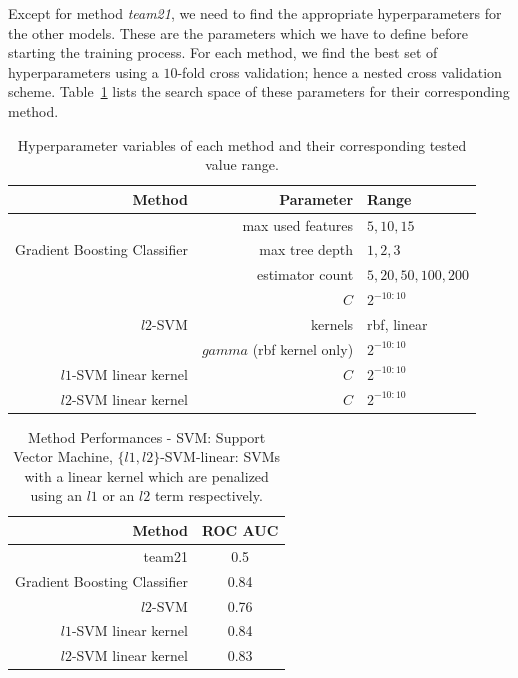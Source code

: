 Except for method \emph{team21}, we need to find the appropriate hyperparameters for the other models. These are the parameters which we have to define before starting the training process. For each method, we find the best set of hyperparameters using a $10$-fold cross validation; hence a nested cross 
validation scheme. Table~\ref{tbl:fcs-qa:hyperparameters} lists the search space of these parameters for their corresponding method.

\begin{table}[!ht]
  \centering
  \begin{tabular}{rrl}
    Method & Parameter & Range \\ \hline \rule{0pt}{2.4ex}
    & max used features & ${5, 10, 15}$  \\
    Gradient Boosting Classifier & max tree depth & ${1, 2, 3}$ \\
    & estimator count & ${5, 20, 50, 100, 200}$ \\ \hline \rule{0pt}{2.4ex}
    & $C$ & $2^{-10:10}$ \\
    $l2$-SVM & kernels & rbf, linear \\
	& $gamma$ (rbf kernel only) & $2^{-10:10}$ \\ \hline \rule{0pt}{2.4ex}
    $l1$-SVM linear kernel & $C$ & $2^{-10:10}$ \\ \hline \rule{0pt}{2.4ex}
    $l2$-SVM linear kernel & $C$ & $2^{-10:10}$ \\
  \end{tabular}
  \caption{Hyperparameter variables of each method and their corresponding tested value range.}
  \label{tbl:fcs-qa:hyperparameters}
\end{table}


\begin{table}[!ht]
  \centering
  \begin{tabular}{rc}
    Method & ROC AUC \\ \hline
    team21 & 0.5  \\
    Gradient Boosting Classifier & 0.84  \\
    $l2$-SVM & 0.76 \\
    $l1$-SVM linear kernel & 0.84  \\
    $l2$-SVM linear kernel & 0.83
  \end{tabular}
  \caption{Method Performances - SVM: Support Vector Machine, $\{l1, l2\}$-SVM-linear: SVMs with a linear kernel which are penalized using an $l1$ or an $l2$ term respectively.}
  \label{tbl:fcs-qa-performances}
\end{table}

